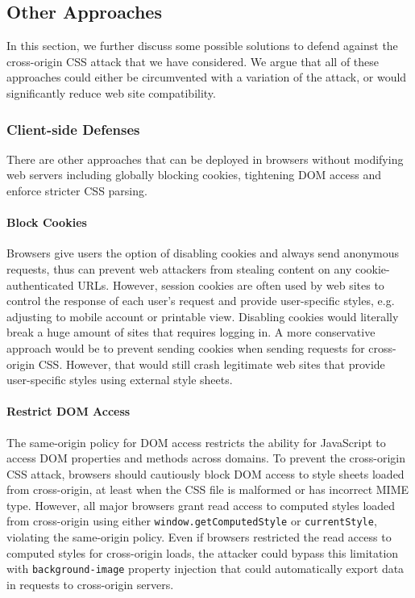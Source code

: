 \documentclass{acm_proc_article-sp}
\begin{document}
\subsection{Other Approaches}
In this section, we further discuss some possible solutions to defend against the cross-origin CSS attack that we have considered. We argue that all of these approaches could either be circumvented with a variation of the attack, or would significantly reduce web site compatibility.

\subsubsection{Client-side Defenses}
There are other approaches that can be deployed in browsers without modifying web servers including globally blocking cookies, tightening DOM access and enforce stricter CSS parsing.

\paragraph{Block Cookies}
Browsers give users the option of disabling cookies and always send anonymous requests, thus can prevent web attackers from stealing content on any cookie-authenticated URLs. However, session cookies are often used by web sites to control the response of each user's request and provide user-specific styles, e.g. adjusting to mobile account or printable view. Disabling cookies would literally break a huge amount of sites that requires logging in. A more conservative approach would be to prevent sending cookies when sending requests for cross-origin CSS. However, that would still crash legitimate web sites that provide user-specific styles using external style sheets.

\paragraph{Restrict DOM Access}
The same-origin policy for DOM access restricts the ability for JavaScript to access DOM properties and methods across domains. To prevent the cross-origin CSS attack, browsers should cautiously block DOM access to style sheets loaded from cross-origin, at least when the CSS file is malformed or has incorrect MIME type. However, all major browsers grant read access to computed styles loaded from cross-origin using either \texttt{window.getComputedStyle} or \texttt{currentStyle}, violating the same-origin policy. Even if browsers restricted the read access to computed styles for cross-origin loads, the attacker could bypass this limitation with \texttt{background-image} property injection that could automatically export data in requests to cross-origin servers.
\end{document}
